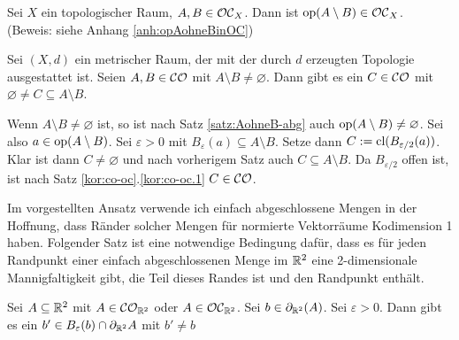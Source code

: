 %
%    
    \begin{satz}\label{satz:opAohneBinOC}
        Sei $X$ ein topologischer Raum, $A,B \in \mathcal{OC}_X$. Dann ist $\text{op}(A \setminus B) \in \mathcal{OC}_X$.\\
        (Beweis: siehe Anhang \ref{anh:opAohneBinOC})
    \end{satz}
%
%
    \begin{satz}
        Sei $(X,d)$ ein metrischer Raum, der mit der durch $d$ erzeugten Topologie ausgestattet ist. Seien $A,B \in \mathcal{CO}$ mit $A \setminus B \neq \varnothing$. Dann gibt es ein $C \in \mathcal{CO}$ mit $\varnothing \neq C \subseteq A \setminus B$.
    \end{satz}
%
    \begin{bew}
        Wenn $A \setminus B \neq \varnothing$ ist, so ist nach Satz \ref{satz:AohneB-abg} auch $\text{op}(A \setminus B) \neq \varnothing$. Sei also $a \in \text{op}(A \setminus B)$. Sei $\varepsilon > 0$ mit $B_\varepsilon(a) \subseteq A \setminus B$. Setze dann $C := \text{cl}(B_{\varepsilon / 2}(a))$. Klar ist dann $C \neq \varnothing$ und nach vorherigem Satz auch $C \subseteq A \setminus B$. Da $B_{\varepsilon / 2}$ offen ist, ist nach Satz \ref{kor:co-oc}.\ref{kor:co-oc.1} $C \in \mathcal{CO}$.
    \end{bew}
%
%
    Im
    vorgestellten Ansatz verwende ich einfach abgeschlossene Mengen in der Hoffnung, dass Ränder solcher Mengen für normierte Vektorräume Kodimension 1 haben. %
    Folgender Satz ist eine notwendige Bedingung dafür, dass es für jeden Randpunkt einer einfach abgeschlossenen Menge im $\mathbb{R}^2$ eine 2-dimensionale Mannigfaltigkeit gibt, die Teil dieses Randes ist und den Randpunkt enthält.
%
    \begin{satz}\label{satz:r2}
        Sei $A \subseteq \mathbb{R}^2$ mit $A \in \mathcal{CO}_{\mathbb{R}^2}$ oder $A \in \mathcal{OC}_{\mathbb{R}^2}$. Sei $b \in \partial_{\mathbb{R}^2}(A)$. Sei $\varepsilon > 0$. Dann gibt es ein $b' \in B_{\varepsilon}(b) \cap \partial_{\mathbb{R}^2} A$ mit $b' \neq b$
    \end{satz}
%
%
